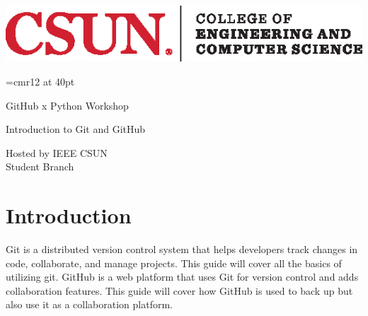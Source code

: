\documentclass[12pt, a4paper]{article}
\begin{document}
\thispagestyle{empty}

\includegraphics[scale=2]{../images/ECS.eps}

\vspace{2in}
\font\tmpfont=cmr12 at 40pt  %
{\centering\tmpfont GitHub x Python Workshop \par}

\vskip30pt

\doublespacing
{\centering\Huge Introduction to Git and GitHub \par}

\vspace{3in}

\begin{flushright}	
	{\Large Hosted by IEEE CSUN\\
	Student Branch}
\end{flushright}
\singlespacing
\newpage

\doublespacing %
\tableofcontents
{}
\singlespacing %
\newpage

\setlength{\headheight}{40pt}
\pagestyle{fancy}

\newenvironment{answer}{\par\bf}{}

\section{Introduction}
Git is a distributed version control system that helps developers track changes in code, collaborate, and manage projects. This guide will cover all the basics of utilizing git. GitHub is a web platform that uses Git for version control and adds collaboration features. This guide will cover how GitHub is used to back up but also use it as a collaboration platform.
\end{document}
